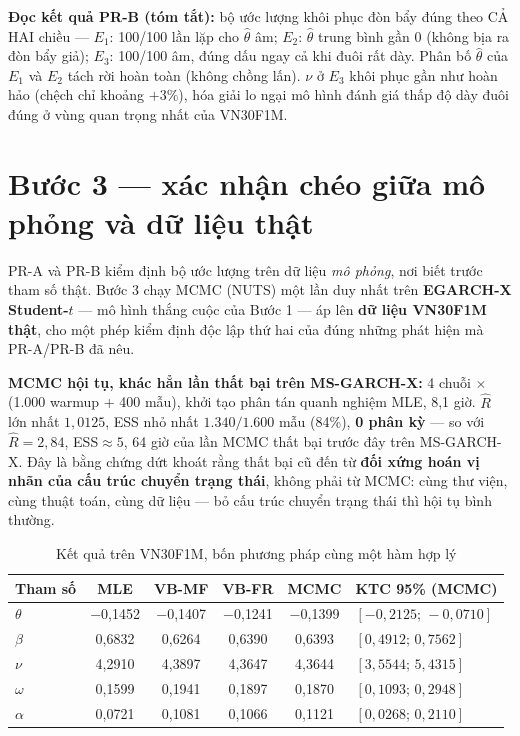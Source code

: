 \documentclass[11pt,a4paper]{article}
\begin{document}
\bigskip

\textbf{Đọc kết quả PR-B (tóm tắt):} bộ ước lượng khôi phục đòn bẩy đúng theo CẢ
HAI chiều --- $E_1$: 100/100 lần lặp cho $\hat\theta$ âm; $E_2$: $\hat\theta$
trung bình gần 0 (không bịa ra đòn bẩy giả); $E_3$: 100/100 âm, đúng dấu ngay cả
khi đuôi rất dày. Phân bố $\hat\theta$ của $E_1$ và $E_2$ tách rời hoàn toàn
(không chồng lấn). $\nu$ ở $E_3$ khôi phục gần như hoàn hảo (chệch chỉ khoảng
$+3\%$), hóa giải lo ngại mô hình đánh giá thấp độ dày đuôi đúng ở vùng quan
trọng nhất của VN30F1M.

\clearpage
\section{Bước 3 --- xác nhận chéo giữa mô phỏng và dữ liệu thật}

PR-A và PR-B kiểm định bộ ước lượng trên dữ liệu \emph{mô phỏng}, nơi biết
trước tham số thật. Bước 3 chạy MCMC (NUTS) một lần duy nhất trên
\textbf{EGARCH-X Student-$t$} --- mô hình thắng cuộc của Bước 1 --- áp lên
\textbf{dữ liệu VN30F1M thật}, cho một phép kiểm định độc lập thứ hai của
đúng những phát hiện mà PR-A/PR-B đã nêu.

\textbf{MCMC hội tụ, khác hẳn lần thất bại trên MS-GARCH-X:} 4 chuỗi $\times$
(1.000 warmup + 400 mẫu), khởi tạo phân tán quanh nghiệm MLE, 8,1 giờ.
$\hat R$ lớn nhất $1{,}0125$, ESS nhỏ nhất $1.340/1.600$ mẫu (84\%), \textbf{0
phân kỳ} --- so với $\hat R=2{,}84$, ESS$\approx 5$, 64 giờ của lần MCMC thất
bại trước đây trên MS-GARCH-X. Đây là bằng chứng dứt khoát rằng thất bại cũ
đến từ \textbf{đối xứng hoán vị nhãn của cấu trúc chuyển trạng thái}, không
phải từ MCMC: cùng thư viện, cùng thuật toán, cùng dữ liệu --- bỏ cấu trúc
chuyển trạng thái thì hội tụ bình thường.

\begin{table}[H]\centering\small
\caption{Kết quả trên VN30F1M, bốn phương pháp cùng một hàm hợp lý}
\begin{tabularx}{\textwidth}{l C C C C L}
\toprule
\textbf{Tham số} & \textbf{MLE} & \textbf{VB-MF} & \textbf{VB-FR} & \textbf{MCMC} & \textbf{KTC 95\% (MCMC)} \\
\midrule
$\theta$ & $-$0{,}1452 & $-$0{,}1407 & $-$0{,}1241 & $-$0{,}1399 & $[-0{,}2125;\,-0{,}0710]$ \\
$\beta$ & 0{,}6832 & 0{,}6264 & 0{,}6390 & 0{,}6393 & $[0{,}4912;\,0{,}7562]$ \\
$\nu$ & 4{,}2910 & 4{,}3897 & 4{,}3647 & 4{,}3644 & $[3{,}5544;\,5{,}4315]$ \\
$\omega$ & 0{,}1599 & 0{,}1941 & 0{,}1897 & 0{,}1870 & $[0{,}1093;\,0{,}2948]$ \\
$\alpha$ & 0{,}0721 & 0{,}1081 & 0{,}1066 & 0{,}1121 & $[0{,}0268;\,0{,}2110]$ \\
\bottomrule
\end{tabularx}
\end{table}
\end{document}
